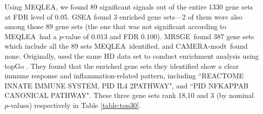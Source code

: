 \documentclass[a4,center,fleqn]{NAR}
\newcommand{\OurMethod}{MEQLEA}
\newcommand{\CMT}{CAMERA-modt}
\newcommand{\genr}{MRSGE}
\begin{document}
	
	Using \OurMethod, we found 89 significant signals out of the entire 1330 gene sets at FDR level
	of 0.05. GSEA found 3 enriched gene sets---2 of them were also among those 89 gene sets (the one
	that was not significant according to \OurMethod~had a $p$-value of 0.013 and FDR 0.100).
	\genr~found 387 gene sets which include all the 89 sets \OurMethod~identified, and \CMT~found none.
	Originally, \cite{labadorf2015rna} used the same HD data set to conduct enrichment analysis using
	topGo \citep{alexa2010topgo}. They found that the enriched gene sets they identified show a clear
	immune response and inflammation-related pattern, including ``REACTOME INNATE IMMUNE SYSTEM, PID IL4
	2PATHWAY", and ``PID NFKAPPAB CANONICAL PATHWAY". These three gene sets rank 18,10 and 3 (by nominal
	$p$-values) respectively in Table \ref{table:top30}.
	
\end{document}
